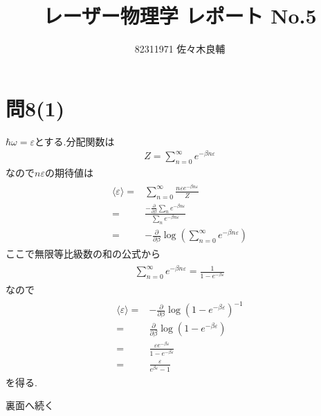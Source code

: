 \documentclass[uplatex,a4j,11pt,dvipdfmx]{jsarticle}
\begin{document}
\title{レーザー物理学 レポート No.5}
\author{82311971 佐々木良輔}
\date{}
\maketitle
\section*{問8(1)}
$\hbar\omega=\varepsilon$とする.分配関数は
\begin{align}
  Z=\sum_{n=0}^\infty e^{-\beta n\varepsilon}
\end{align}
なので$n\varepsilon$の期待値は
\begin{align}
  \begin{split}
    \langle\varepsilon\rangle=&\sum_{n=0}^\infty\frac{n\varepsilon e^{-\beta n\varepsilon}}{Z}\\
    =&\frac{-\frac{\partial}{\partial\beta}\sum_n e^{-\beta n\varepsilon}}{\sum_ne^{-\beta n\varepsilon}}\\
    =&-\frac{\partial}{\partial\beta}\log\left(\sum_{n=0}^\infty e^{-\beta n\varepsilon}\right)
  \end{split}
\end{align}
ここで無限等比級数の和の公式から
\begin{align}
  \begin{split}
    \sum_{n=0}^\infty e^{-\beta n\varepsilon}=\frac{1}{1-e^{-\beta\varepsilon}}
  \end{split}
\end{align}
なので
\begin{align}
  \begin{split}
    \langle\varepsilon\rangle=&-\frac{\partial}{\partial\beta}\log\left(1-e^{-\beta\varepsilon}\right)^{-1}\\
    =&\frac{\partial}{\partial\beta}\log\left(1-e^{-\beta\varepsilon}\right)\\
    =&\frac{\varepsilon e^{-\beta\varepsilon}}{1-e^{-\beta\varepsilon}}\\
    =&\frac{\varepsilon}{e^{\beta\varepsilon}-1}
  \end{split}
\end{align}
を得る.
\vfill
\begin{flushright}
  裏面へ続く
\end{flushright}
\newpage
\end{document}
